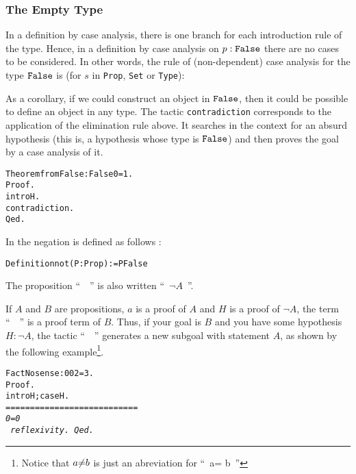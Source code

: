 \documentclass[11pt]{article}
\newcommand{\refmancite}[1]{{}}
\begin{document}
\subsubsection{The Empty Type}

In a definition by case analysis, there is one branch for each
introduction rule of the type. Hence, in a definition by case analysis
on $p:\texttt{False}$ there are no cases to be considered. In other words, the
rule of (non-dependent) case analysis for the type $\texttt{False}$ is 
(for $s$ in  \texttt{Prop}, \texttt{Set} or \texttt{Type}):

\begin{center}
         {}
\end{center}

As a corollary, if we could construct an object in $\texttt{False}$, then it
could be possible to define an object in any type.  The tactic
\texttt{contradiction} \refmancite{Section \ref{Contradiction}}
corresponds to the application of the elimination rule above.  It
searches in the context for an absurd hypothesis (this is, a
hypothesis whose type is $\texttt{False}$) and then proves the goal by a case
analysis of it.

\begin{alltt}
Theorem fromFalse : False \arrow{} 0=1.
Proof.
 intro H. 
 contradiction.
Qed.
\end{alltt}


In {\coq} the negation is defined as follows :

\begin{alltt}
Definition not (P:Prop) := P {\arrow} False
\end{alltt}

The proposition ``~~'' is also written ``~$\neg A$~''.

If $A$ and $B$ are propositions, $a$ is a proof of $A$ and
$H$ is a proof of $\neg A$,
the term ``~~'' is a proof term of
$B$.
Thus, if your goal is $B$ and you have some hypothesis $H:\neg A$,
the tactic ``~~'' generates a new subgoal with
statement $A$, as shown by  the following example\footnote{Notice that
$a\mbox{$\neq$} b$ is just an abreviation for ``~\coqnot a= b~''}.

\begin{alltt}
Fact Nosense : 0 {\coqdiff} 0 {\arrow} 2 = 3.
Proof.
  intro H; case H.
\it
===========================
  0 = 0
\tt
  reflexivity.
Qed.
\end{alltt}
\end{document}

